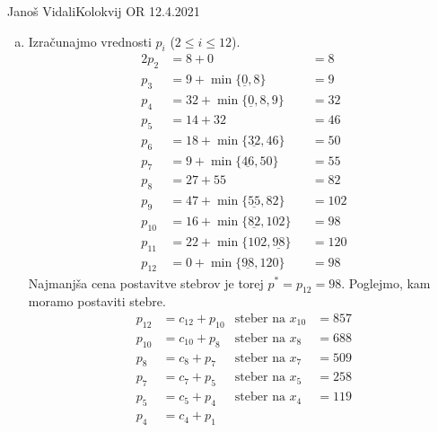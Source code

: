 \begin{naloga}{Janoš Vidali}{Kolokvij OR 12.4.2021}
\begin{odgovor}
\begin{enumerate}[(a)]
\item Izračunajmo vrednosti $p_i$ ($2 \le i \le 12$).
\begin{alignat*}{2}
p_2    &=  8 + 0                           &&= 8  \\
p_3    &=  9 + \min\{\underline{0}, 8\}    &&= 9  \\
p_4    &= 32 + \min\{\underline{0}, 8, 9\} &&= 32  \\
p_5    &= 14 + 32                          &&= 46 \\
p_6    &= 18 + \min\{\underline{32}, 46\}  &&= 50 \\
p_7    &=  9 + \min\{\underline{46}, 50\}  &&= 55 \\
p_8    &= 27 + 55                          &&= 82 \\
p_9    &= 47 + \min\{\underline{55}, 82\}  &&= 102 \\
p_{10} &= 16 + \min\{\underline{82}, 102\} &&= 98 \\
p_{11} &= 22 + \min\{102, \underline{98}\} &&= 120 \\
p_{12} &=  0 + \min\{\underline{98}, 120\} &&= 98
\end{alignat*}
Najmanjša cena postavitve stebrov je torej $p^* = p_{12} = 98$.
Poglejmo, kam moramo postaviti stebre.
\begin{align*}
p_{12} &= c_{12} + p_{10} & \text{steber na } x_{10} &= 857 \\
p_{10} &= c_{10} + p_8    & \text{steber na } x_8    &= 688 \\
p_8    &= c_8    + p_7    & \text{steber na } x_7    &= 509 \\
p_7    &= c_7    + p_5    & \text{steber na } x_5    &= 258 \\
p_5    &= c_5    + p_4    & \text{steber na } x_4    &= 119 \\
p_4    &= c_4    + p_1
\end{align*}
\end{enumerate}
\end{odgovor}
\end{naloga}
